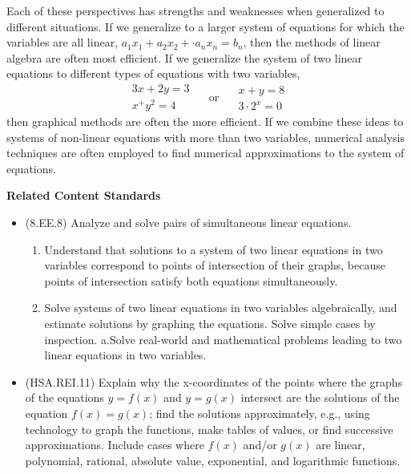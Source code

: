 \documentclass[
]{book}
\providecommand{\tightlist}{%
  \setlength{\itemsep}{0pt}\setlength{\parskip}{0pt}}
\newenvironment{standards}{}{}
\theoremstyle{definition}
\theoremstyle{definition}
\theoremstyle{definition}
\theoremstyle{definition}
\theoremstyle{remark}
\begin{document}
Each of these perspectives has strengths and weaknesses when generalized to different situations. If we generalize to a larger system of equations for which the variables are all linear, \(a_1 x_1 + a_2 x_2 + \cdot a_n x_n = b_n\), then the methods of linear algebra are often most efficient. If we generalize the system of two linear equations to different types of equations with two variables,
\[\begin{matrix} 3x+2y=3 \\ x^+y^2=4  \end{matrix} \quad \mbox{ or } \quad \begin{matrix} x+y=8 \\ 3\cdot 2^x = 0 \end{matrix}\] then graphical methods are often the more efficient. If we combine these ideas to systems of non-linear equations with more than two variables, numerical analysis techniques are often employed to find numerical approximations to the system of equations.

\begin{standards}

\begin{center}
\textbf{Related Content Standards}

\end{center}

\begin{itemize}
\tightlist
\item
  (8.EE.8) Analyze and solve pairs of simultaneous linear equations.

  \begin{enumerate}
  \def\labelenumi{\alph{enumi}.}
  \tightlist
  \item
    Understand that solutions to a system of two linear equations in two variables correspond to points of intersection of their graphs, because points of intersection satisfy both equations simultaneously.
  \item
    Solve systems of two linear equations in two variables algebraically, and estimate solutions by graphing the equations. Solve simple cases by inspection.
    a.Solve real-world and mathematical problems leading to two linear equations in two variables.
  \end{enumerate}
\item
  (HSA.REI.11) Explain why the x-coordinates of the points where the graphs of the equations \(y = f(x)\) and \(y = g(x)\) intersect are the solutions of the equation \(f(x) = g(x)\); find the solutions approximately, e.g., using technology to graph the functions, make tables of values, or find successive approximations. Include cases where \(f(x)\) and/or \(g(x)\) are linear, polynomial, rational, absolute value, exponential, and logarithmic functions.
\end{itemize}

\end{standards}
\end{document}
